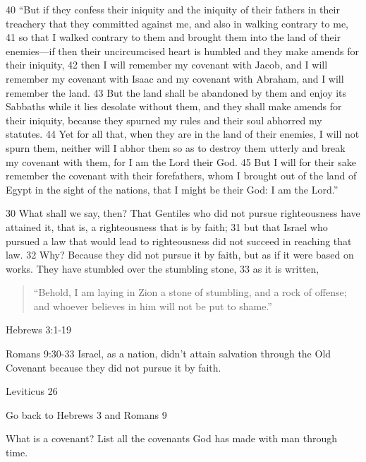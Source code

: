 \begin{bible}
40 ``But if they confess their iniquity and the iniquity of their fathers in their treachery that they committed against me, and also in walking contrary to me, 41 so that I walked contrary to them and brought them into the land of their enemies—if then their uncircumcised heart is humbled and they make amends for their iniquity, 42 then I will remember my covenant with Jacob, and I will remember my covenant with Isaac and my covenant with Abraham, and I will remember the land. 43 But the land shall be abandoned by them and enjoy its Sabbaths while it lies desolate without them, and they shall make amends for their iniquity, because they spurned my rules and their soul abhorred my statutes. 44 Yet for all that, when they are in the land of their enemies, I will not spurn them, neither will I abhor them so as to destroy them utterly and break my covenant with them, for I am the Lord their God. 45 But I will for their sake remember the covenant with their forefathers, whom I brought out of the land of Egypt in the sight of the nations, that I might be their God: I am the Lord.''


30 What shall we say, then? That Gentiles who did not pursue righteousness have attained it, that is, a righteousness that is by faith; 31 but that Israel who pursued a law that would lead to righteousness did not succeed in reaching that law. 32 Why? Because they did not pursue it by faith, but as if it were based on works. They have stumbled over the stumbling stone, 33 as it is written,

\begin{quote}
``Behold, I am laying in Zion a stone of stumbling, and a rock of offense; and whoever believes in him will not be put to shame.''
\end{quote}
		
\end{bible}

\begin{discussion}



Hebrews 3:1-19

Romans 9:30-33  Israel, as a nation,  didn't attain salvation through the Old Covenant because they did not pursue it by faith.


Leviticus 26


Go back to Hebrews 3 and Romans 9

\end{discussion}

\begin{questions}
\q What is a covenant?
\q List all the covenants God has made with man through time.
\q 
\q 
\end{questions}